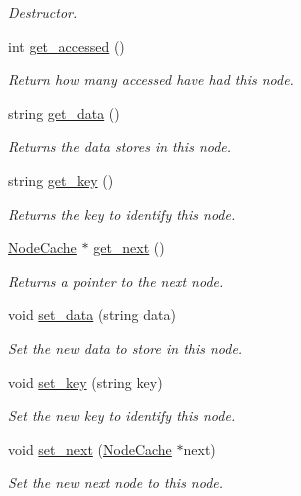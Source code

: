 \begin{DoxyCompactItemize}
\begin{DoxyCompactList}\small\item\em Destructor. \end{DoxyCompactList}\item 
int \hyperlink{classNodeCache_a78c4d4818132f8acace40f5c9a95a526}{get\+\_\+accessed} ()
\begin{DoxyCompactList}\small\item\em Return how many accessed have had this node. \end{DoxyCompactList}\item 
string \hyperlink{classNodeCache_ae11cea2fa334e2f653d46938ac4c97a8}{get\+\_\+data} ()
\begin{DoxyCompactList}\small\item\em Returns the data stores in this node. \end{DoxyCompactList}\item 
string \hyperlink{classNodeCache_a9d41e568632b7382a7f470c70c416028}{get\+\_\+key} ()
\begin{DoxyCompactList}\small\item\em Returns the key to identify this node. \end{DoxyCompactList}\item 
\hyperlink{classNodeCache}{Node\+Cache} $\ast$ \hyperlink{classNodeCache_a3c3e2abe476346e2f1ec31ea6fc31111}{get\+\_\+next} ()
\begin{DoxyCompactList}\small\item\em Returns a pointer to the next node. \end{DoxyCompactList}\item 
void \hyperlink{classNodeCache_aa83c8629d2b01dfaa0149a63d17c31e1}{set\+\_\+data} (string data)
\begin{DoxyCompactList}\small\item\em Set the new data to store in this node. \end{DoxyCompactList}\item 
void \hyperlink{classNodeCache_af45873de5ff6c83e3b9d92832dec2199}{set\+\_\+key} (string key)
\begin{DoxyCompactList}\small\item\em Set the new key to identify this node. \end{DoxyCompactList}\item 
void \hyperlink{classNodeCache_ad733051c05052913ec36c01e7bbc1332}{set\+\_\+next} (\hyperlink{classNodeCache}{Node\+Cache} $\ast$next)
\begin{DoxyCompactList}\small\item\em Set the new next node to this node. \end{DoxyCompactList}\item 

\end{DoxyCompactItemize}
